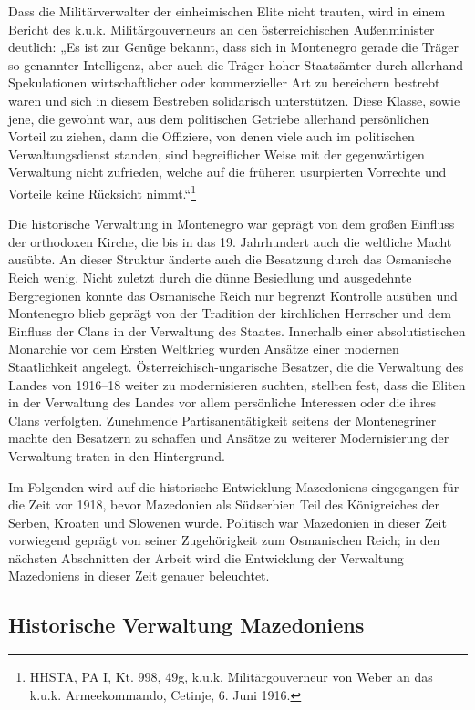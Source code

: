 Dass die Militärverwalter der einheimischen Elite nicht trauten, wird in einem Bericht des k.u.k. Militärgouverneurs an den österreichischen Außenminister deutlich: „Es ist zur Genüge bekannt, dass sich in Montenegro gerade die Träger so genannter Intelligenz, aber auch die Träger hoher Staatsämter durch allerhand Spekulationen wirtschaftlicher oder kommerzieller Art zu bereichern bestrebt waren und sich in diesem Bestreben solidarisch unterstützen. Diese Klasse, sowie jene, die gewohnt war, aus dem politischen Getriebe allerhand persönlichen Vorteil zu ziehen, dann die Offiziere, von denen viele auch im politischen Verwaltungsdienst standen, sind begreiflicher Weise mit der gegenwärtigen Verwaltung nicht zufrieden, welche auf die früheren usurpierten Vorrechte und Vorteile keine Rücksicht nimmt.“\footnote{HHSTA, PA I, Kt. 998, 49g, k.u.k. Militärgouverneur von Weber an das k.u.k. Armeekommando, Cetinje, 6. Juni 1916.} \par
Die historische Verwaltung in Montenegro war geprägt von dem großen Einfluss der orthodoxen Kirche, die bis in das 19. Jahrhundert auch die weltliche Macht ausübte. An dieser Struktur änderte auch die Besatzung durch das Osmanische Reich wenig. Nicht zuletzt durch die dünne Besiedlung und ausgedehnte Bergregionen konnte das Osmanische Reich nur begrenzt Kontrolle ausüben und Montenegro blieb geprägt von der Tradition der kirchlichen Herrscher und dem Einfluss der Clans in der Verwaltung des Staates. Innerhalb einer absolutistischen Monarchie vor dem Ersten Weltkrieg wurden Ansätze einer modernen Staatlichkeit angelegt. Österreichisch-ungarische Besatzer, die die Verwaltung des Landes von 1916–18 weiter zu modernisieren suchten, stellten fest, dass die Eliten in der Verwaltung des Landes vor allem persönliche Interessen oder die ihres Clans verfolgten. Zunehmende Partisanentätigkeit seitens der Montenegriner machte den Besatzern zu schaffen und Ansätze zu weiterer Modernisierung der Verwaltung traten in den Hintergrund.\par

Im Folgenden wird auf die historische Entwicklung Mazedoniens eingegangen für die Zeit vor 1918, bevor Mazedonien als Südserbien Teil des Königreiches der Serben, Kroaten und Slowenen wurde. Politisch war Mazedonien in dieser Zeit vorwiegend geprägt von seiner Zugehörigkeit zum Osmanischen Reich; in den nächsten Abschnitten der Arbeit wird die Entwicklung der Verwaltung Mazedoniens in dieser Zeit genauer beleuchtet.

\subsection{Historische Verwaltung Mazedoniens}

